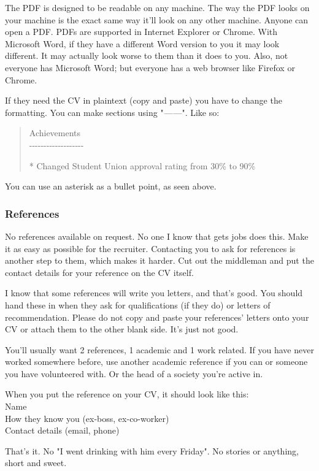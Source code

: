 \documentclass{article}
\begin{document}
The PDF is designed to be readable on any machine. The way the PDF looks
on your machine is the exact same way it'll look on any other machine.
Anyone can open a PDF. PDFs are supported in Internet Explorer or
Chrome. With Microsoft Word, if they have a different Word version to
you it may look different. It may actually look worse to them than it
does to you. Also, not everyone has Microsoft Word; but everyone has a
web browser like Firefox or Chrome.

If they need the CV in plaintext (copy and paste) you have to change the
formatting. You can make sections using " --- ---". Like so:
\begin{quote}
Achievements\\
-\/-\/-\/-\/-\/-\/-\/-\/-\/-\/-\/-\/-\/-\/-\/-\/-\/-\/-

* Changed Student Union approval rating from 30\% to 90\%
\end{quote}
You can use an asterisk as a bullet point, as seen above.

\subsubsection{References}
No references available on request. No one I know that gets jobs does
this. Make it as easy as possible for the recruiter. Contacting you to
ask for references is another step to them, which makes it harder. Cut
out the middleman and put the contact details for your reference on the
CV itself.

I know that some references will write you letters, and that's good. You
should hand these in when they ask for qualifications (if they do) or
letters of recommendation. Please do not copy and paste your references'
letters onto your CV or attach them to the other blank side. It's just
not good.

You'll usually want 2 references, 1 academic and 1 work related. If you
have never worked somewhere before, use another academic reference if
you can or someone you have volunteered with. Or the head of a society
you're active in.

When you put the reference on your CV, it should look like this:\\
Name\\
How they know you (ex-boss, ex-co-worker)\\
Contact details (email, phone)

That's it. No "I went drinking with him every Friday". No stories or
anything, short and sweet.
\end{document}
